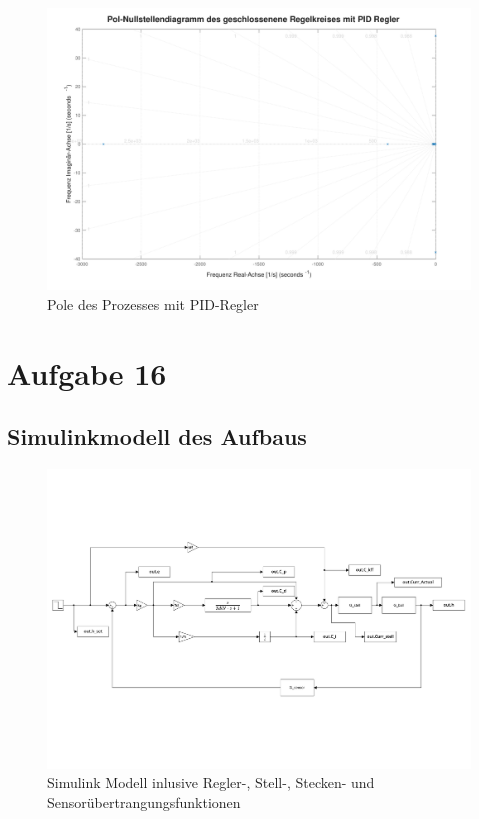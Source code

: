 			\begin{figure}[H]
				\centering
				\includegraphics[width=.9\textwidth]{./figure/polemap_pid_untuned.pdf}
				\caption{Pole des Prozesses mit PID-Regler}
				\label{fig:polePID}
			\end{figure}


\newpage
\section{Aufgabe 16}\label{sec:Aufgabe16}
	\subsection*{Simulinkmodell des Aufbaus}
			\begin{figure}[H]
				\centering
				\includegraphics[width=\textwidth]{./figure/magnet_model.pdf}
				\caption{Simulink Modell inlusive Regler-, Stell-, Stecken- und Sensorübertrangungsfunktionen}
				\label{fig:model}
			\end{figure}
\newpage

